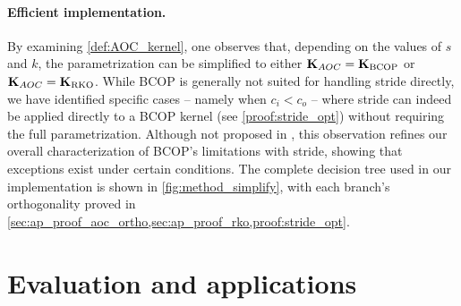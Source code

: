 
\vspace{-1mm}\paragraph{Efficient implementation.}

    
    By examining \cref{def:AOC_kernel}, one observes that, depending on the values of $s$ and $k$, the parametrization can be simplified to either $ \mathbf{K}_{AOC} = \mathbf{K}_{\text{BCOP}} $ or  $\mathbf{K}_{AOC} = \mathbf{K}_{\text{RKO}}$. While BCOP is generally not suited for handling stride directly, we have identified specific cases -- namely when $c_i < c_o$ -- where stride can indeed be applied directly to a BCOP kernel (see \cref{proof:stride_opt}) without requiring the full parametrization. Although not proposed in \cite{li_preventing_2019}, this observation refines our overall characterization of BCOP’s limitations with stride, showing that exceptions exist under certain conditions. The complete decision tree used in our implementation is shown in \cref{fig:method_simplify}, with each branch’s orthogonality proved in \cref{sec:ap_proof_aoc_ortho,sec:ap_proof_rko,proof:stride_opt}.
    
    


\section{Evaluation and applications}


